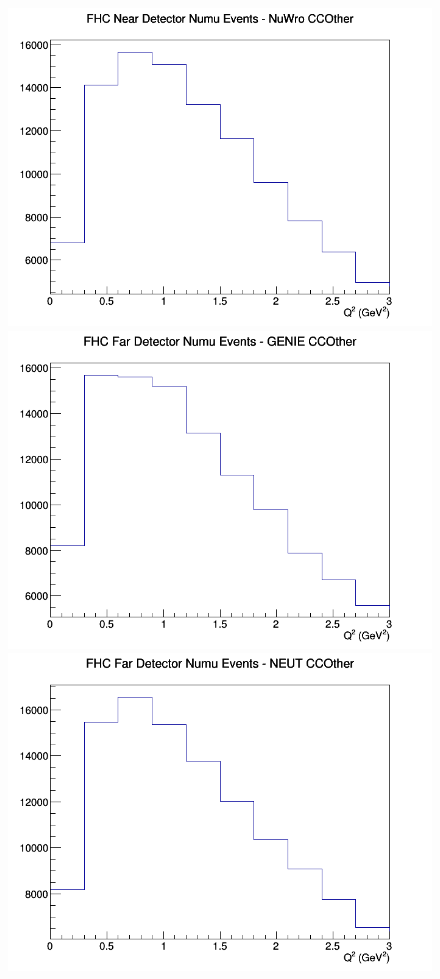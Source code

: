 \documentclass[12pt]{article}
\begin{document}
\begin{figure}[h]
\includegraphics[width=\linewidth]{Q2/nominal/CCOther_FHC_ND_numu_Q2_NuWro.png}
\endminipage
\newline
{}
\includegraphics[width=\linewidth]{Q2/nominal/CCOther_FHC_FD_numu_Q2_GENIE.png}
\endminipage
{}
\includegraphics[width=\linewidth]{Q2/nominal/CCOther_FHC_FD_numu_Q2_NEUT.png}

\end{figure}
\end{document}
